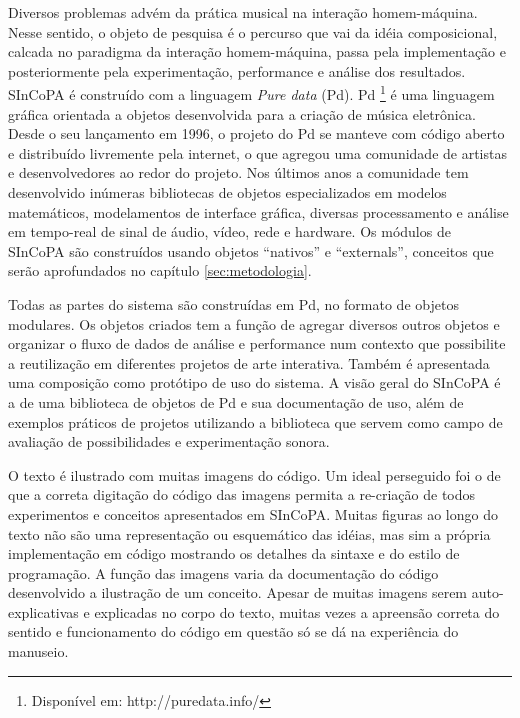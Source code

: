 \documentclass{ppgmus}
\newcommand{\pd}{Pd}
\begin{document}

Diversos problemas advém da prática
musical na interação homem-máquina. Nesse sentido, o 
objeto de pesquisa é o percurso que vai da idéia composicional, calcada
no paradigma da interação homem-máquina,  passa pela implementação
e posteriormente pela experimentação, performance e análise dos resultados.
SInCoPA é construído com a linguagem \textit{Pure data} (\pd). 
Pd \cite{pd:96}\footnote{Disponível em: http://puredata.info/} é uma linguagem gráfica orientada a objetos desenvolvida para a criação de música eletrônica. 
Desde o seu lançamento em 1996, o projeto do Pd se manteve
com código aberto e distribuído livremente pela internet, o que agregou uma comunidade de 
artistas e desenvolvedores ao redor do projeto.
Nos últimos anos a comunidade tem desenvolvido inúmeras bibliotecas de objetos especializados em modelos matemáticos, modelamentos de interface gráfica, diversas 
processamento e análise em tempo-real de sinal de áudio, vídeo, rede e hardware. 
Os módulos de SInCoPA são construídos usando objetos ``nativos'' e ``externals'', 
conceitos que serão aprofundados no capítulo \ref{sec:metodologia}. 

Todas as partes do sistema são construídas em Pd, no formato de objetos
modulares. Os objetos criados tem a função de agregar diversos outros objetos e organizar o fluxo de dados
de análise e performance num contexto que possibilite a reutilização em diferentes projetos de arte interativa.
Também é apresentada uma composição como protótipo de uso do sistema. A visão geral do
SInCoPA é a de uma biblioteca de objetos de Pd e sua documentação de uso, 
além de exemplos práticos de projetos
utilizando a biblioteca que servem como campo de avaliação de possibilidades e experimentação sonora.


O texto é ilustrado com muitas imagens do código. Um ideal perseguido foi o de que a correta
digitação do código das imagens permita a re-criação de todos experimentos e conceitos apresentados
em SInCoPA. Muitas figuras ao longo do texto não são uma representação ou esquemático das idéias, mas sim a própria
implementação em código mostrando os detalhes da sintaxe e do estilo de programação.
A função das imagens varia da documentação do código desenvolvido a ilustração de um conceito.
Apesar de muitas imagens serem auto-explicativas e explicadas no corpo do texto, muitas vezes a apreensão 
correta do sentido e funcionamento do código em questão só se dá na experiência do manuseio. 
\end{document}
